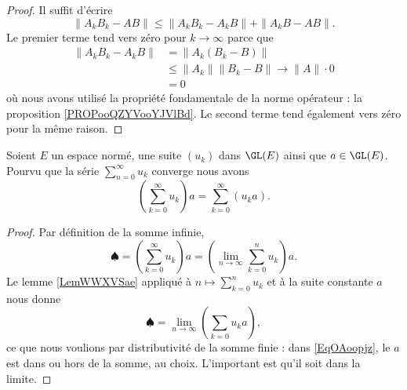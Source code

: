 \begin{proof}
    Il suffit d'écrire
    \begin{equation}
        \| A_kB_k-AB \|\leq \| A_kB_k-A_kB \|+\| A_kB-AB \|.
    \end{equation}
    Le premier terme tend vers zéro pour \( k\to\infty\) parce que 
    \begin{subequations}
        \begin{align}
            \| A_kB_k-A_kB \|&=\| A_k(B_k-B) \|\\
            &\leq \| A_k \|\| B_k-B \|\to \| A \|\cdot 0\\
            &=0
        \end{align}
    \end{subequations}
    où nous avons utilisé la propriété fondamentale de la norme opérateur : la proposition \ref{PROPooQZYVooYJVlBd}. Le second terme tend également vers zéro pour la même raison.
\end{proof}

\begin{proposition} \label{PropQXqEPuG}
    Soient \( E\) un espace normé, une suite \( (u_k)\) dans \( \GL(E)\) ainsi que \( a\in\GL(E)\). Pourvu que la série \( \sum_{n=0}^{\infty}u_k\) converge nous avons
    \begin{equation}
        \left( \sum_{k=0}^{\infty}u_k \right)a=\sum_{k=0}^{\infty}(u_ka).
    \end{equation}
\end{proposition}

\begin{proof}
    Par définition de la somme infinie,
    \begin{equation}
        \spadesuit=\left( \sum_{k=0}^{\infty}u_k \right)a=\left( \lim_{n\to \infty} \sum_{k=0}^nu_k \right)a.
    \end{equation}
    Le lemme \ref{LemWWXVSae} appliqué à \( n\mapsto\sum_{k=0}^nu_k\) et à la suite constante \( a\) nous donne
    \begin{equation}    \label{EqOAoopjz}
        \spadesuit=\lim_{n\to \infty} \left( \sum_{k=0}u_ka \right),
    \end{equation}
    ce que nous voulions par distributivité de la somme finie : dans \eqref{EqOAoopjz}, le \( a\) est dans ou hors de la somme, au choix. L'important est qu'il soit dans la limite.
\end{proof}

